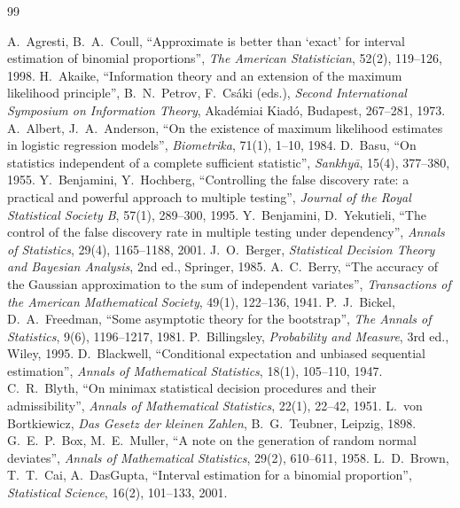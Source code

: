 \documentclass[main.tex]{subfiles}
\begin{document}
\begin{thebibliography}{99}

 A.~Agresti, B.~A.~Coull, ``Approximate is better than `exact' for interval estimation of binomial proportions'', \emph{The American Statistician}, 52(2), 119--126, 1998.
 H.~Akaike, ``Information theory and an extension of the maximum likelihood principle'', B.~N.~Petrov, F.~Csáki (eds.), \emph{Second International Symposium on Information Theory}, Akadémiai Kiadó, Budapest, 267--281, 1973.
 A.~Albert, J.~A.~Anderson, ``On the existence of maximum likelihood estimates in logistic regression models'', \emph{Biometrika}, 71(1), 1--10, 1984.
 D.~Basu, ``On statistics independent of a complete sufficient statistic'', \emph{Sankhy\=a}, 15(4), 377--380, 1955.
 Y.~Benjamini, Y.~Hochberg, ``Controlling the false discovery rate: a practical and powerful approach to multiple testing'', \emph{Journal of the Royal Statistical Society B}, 57(1), 289--300, 1995.
 Y.~Benjamini, D.~Yekutieli, ``The control of the false discovery rate in multiple testing under dependency'', \emph{Annals of Statistics}, 29(4), 1165--1188, 2001.
 J.~O.~Berger, \emph{Statistical Decision Theory and Bayesian Analysis}, 2nd ed., Springer, 1985.
 A.~C.~Berry, ``The accuracy of the Gaussian approximation to the sum of independent variates'', \emph{Transactions of the American Mathematical Society}, 49(1), 122--136, 1941.
 P.~J.~Bickel, D.~A.~Freedman, ``Some asymptotic theory for the bootstrap'', \emph{The Annals of Statistics}, 9(6), 1196--1217, 1981.
 P.~Billingsley, \emph{Probability and Measure}, 3rd ed., Wiley, 1995.
 D.~Blackwell, ``Conditional expectation and unbiased sequential estimation'', \emph{Annals of Mathematical Statistics}, 18(1), 105--110, 1947.
 C.~R.~Blyth, ``On minimax statistical decision procedures and their admissibility'', \emph{Annals of Mathematical Statistics}, 22(1), 22--42, 1951.
 L.~von Bortkiewicz, \emph{Das Gesetz der kleinen Zahlen}, B.~G.~Teubner, Leipzig, 1898.
 G.~E.~P.~Box, M.~E.~Muller, ``A note on the generation of random normal deviates'', \emph{Annals of Mathematical Statistics}, 29(2), 610--611, 1958.
 L.~D.~Brown, T.~T.~Cai, A.~DasGupta, ``Interval estimation for a binomial proportion'', \emph{Statistical Science}, 16(2), 101--133, 2001.

\end{thebibliography}
\end{document}
